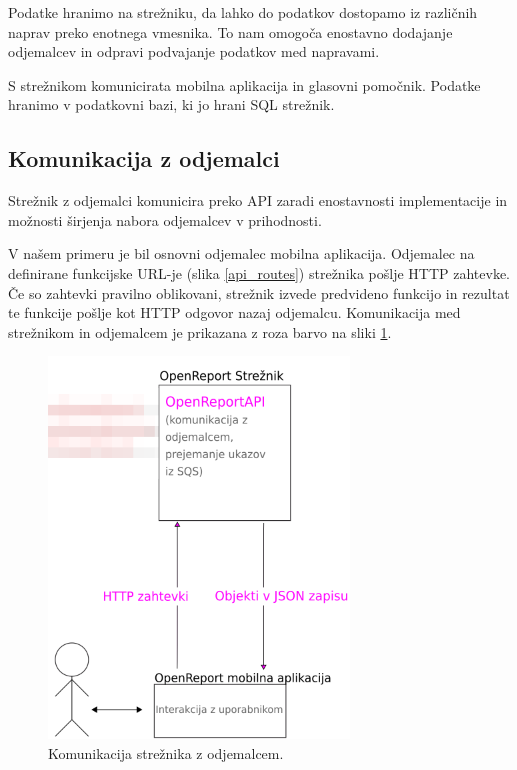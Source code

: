 \documentclass[a4paper, 12pt]{book}
\begin{document}
Podatke hranimo na strežniku, da lahko do podatkov dostopamo iz različnih naprav preko enotnega vmesnika.
To nam omogoča enostavno dodajanje odjemalcev in odpravi podvajanje podatkov med napravami.

S strežnikom komunicirata mobilna aplikacija in glasovni pomočnik.
Podatke hranimo v podatkovni bazi, ki jo hrani SQL strežnik.



\subsection{Komunikacija z odjemalci}

Strežnik z odjemalci komunicira preko API zaradi enostavnosti implementacije in možnosti širjenja nabora odjemalcev v prihodnosti.

V našem primeru je bil osnovni odjemalec mobilna aplikacija.
Odjemalec na definirane funkcijske URL-je (slika \ref{api_routes}) strežnika pošlje HTTP zahtevke.
Če so zahtevki pravilno oblikovani, strežnik izvede predvideno funkcijo in rezultat te funkcije pošlje kot HTTP odgovor nazaj odjemalcu.
Komunikacija med strežnikom in odjemalcem je prikazana z roza barvo na sliki \ref{plan_server_client}.


\begin{figure}[H]
\begin{center}
\includegraphics[width=8cm]{plan_server_client}
\end{center}
\caption{Komunikacija strežnika z odjemalcem.}
\label{plan_server_client}
\end{figure}
\end{document}
